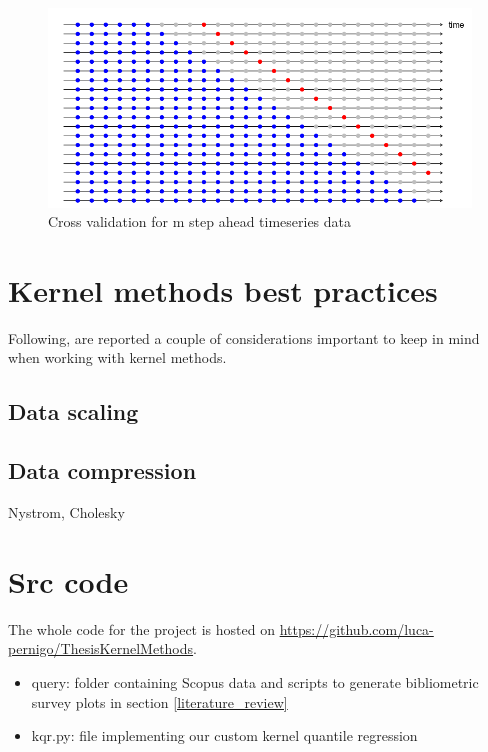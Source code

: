 \begin{figure}
    \includegraphics[width=\textwidth]{images/crossvalidationtimeseries2.png}
    \caption{Cross validation for m step ahead timeseries data \cite{hyndman2018forecasting}}
    \label{fig:crossvalidationtimeseries2}
\end{figure}

\section{Kernel methods best practices}
Following, are reported a couple of considerations important to keep in mind when working with kernel methods.
\subsection{Data scaling}
\subsection{Data compression}
Nystrom, Cholesky

\newpage
\section{Src code}\label{src_code}
The whole code for the project is hosted on
\url{https://github.com/luca-pernigo/ThesisKernelMethods}\label{github_repo}.
\\
\begin{itemize}
    \item query: folder containing Scopus data and scripts to generate bibliometric survey plots in section \ref{literature_review}
    \item kqr.py: file implementing our custom kernel quantile regression
\end{itemize}
